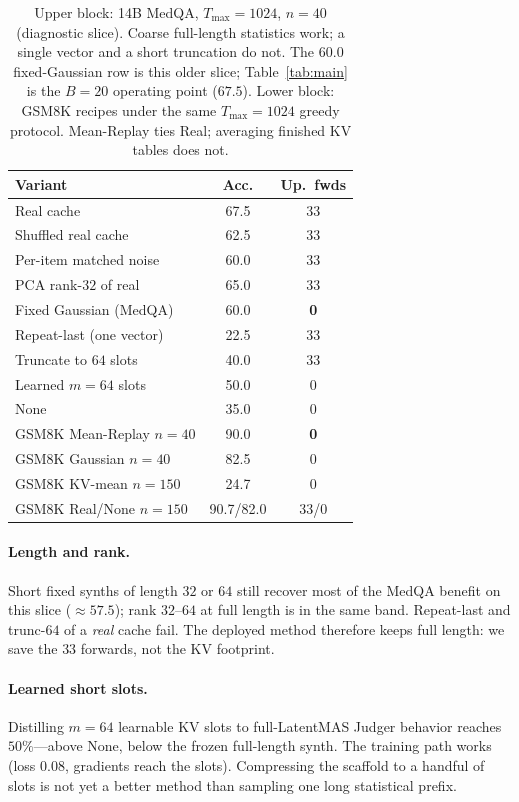 \documentclass[11pt]{article}
\begin{document}
\begin{table}[t]
\centering
\small
\setlength{\tabcolsep}{3pt}
\begin{tabular}{lcc}
\toprule
Variant & Acc. & Up.\ fwds \\
\midrule
Real cache & 67.5 & 33 \\
Shuffled real cache & 62.5 & 33 \\
Per-item matched noise & 60.0 & 33 \\
PCA rank-$32$ of real & 65.0 & 33 \\
Fixed Gaussian (MedQA) & 60.0 & \textbf{0} \\
Repeat-last (one vector) & 22.5 & 33 \\
Truncate to $64$ slots & 40.0 & 33 \\
Learned $m{=}64$ slots & 50.0 & 0 \\
None & 35.0 & 0 \\
\midrule
GSM8K Mean-Replay $n{=}40$ & 90.0 & \textbf{0} \\
GSM8K Gaussian $n{=}40$ & 82.5 & 0 \\
GSM8K KV-mean $n{=}150$ & 24.7 & 0 \\
GSM8K Real/None $n{=}150$ & 90.7/82.0 & 33/0 \\
\bottomrule
\end{tabular}
\caption{Upper block: 14B MedQA, $T_{\max}{=}1024$, $n{=}40$ (diagnostic
slice).
Coarse full-length statistics work; a single vector and a short
truncation do not.
The $60.0$ fixed-Gaussian row is this older slice; Table~\ref{tab:main}
is the $B{=}20$ operating point ($67.5$).
Lower block: GSM8K recipes under the same $T_{\max}{=}1024$ greedy
protocol.
Mean-Replay ties Real; averaging finished KV tables does not.}
\label{tab:ablate}
\end{table}

\paragraph{Length and rank.}
Short fixed synths of length $32$ or $64$ still recover most of the
MedQA benefit on this slice (${\approx}57.5$); rank $32$--$64$ at full
length is in the same band.
Repeat-last and trunc-$64$ of a \emph{real} cache fail.
The deployed method therefore keeps full length: we save the $33$
forwards, not the KV footprint.

\paragraph{Learned short slots.}
Distilling $m{=}64$ learnable KV slots to full-LatentMAS Judger
behavior reaches $50\%$---above None, below the frozen full-length
synth.
The training path works (loss $0.08$, gradients reach the slots).
Compressing the scaffold to a handful of slots is not yet a better
method than sampling one long statistical prefix.
\end{document}
